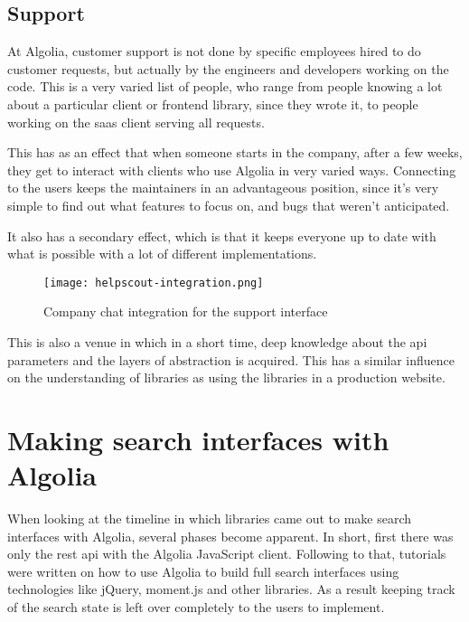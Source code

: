\subsection{Support}
\label{support}

At Algolia, customer support is not done by specific employees hired to do customer requests, but actually by the engineers and developers working on the code. This is a very varied list of people, who range from people knowing a lot about a particular client or frontend \gls{library}, since they wrote it, to people working on the \gls{saas} client serving all requests.

This has as an effect that when someone starts in the company, after a few weeks, they get to interact with clients who use Algolia in very varied ways. Connecting to the users keeps the maintainers in an advantageous position, since it's very simple to find out what features to focus on, and bugs that weren't anticipated.

It also has a secondary effect, which is that it keeps everyone up to date with what is possible with a lot of different implementations.

\begin{figure}[H]
  \centering
  \texttt{[image: helpscout-integration.png]}
  \caption{Company chat integration for the support interface}
  \label{figure:support}
\end{figure}

This is also a venue in which in a short time, deep knowledge about the \acrshort{api} parameters and the layers of abstraction is acquired. This has a similar influence on the understanding of libraries as using the libraries in a production website.

\section{Making search interfaces with Algolia} %
\label{sec:making_search_interfaces_with_algolia}

When looking at the timeline in which libraries came out to make search interfaces with Algolia, several phases become apparent. In short, first there was only the \acrshort{rest} \acrshort{api} with the Algolia JavaScript client. Following to that, tutorials were written on how to use Algolia to build full search interfaces using technologies like jQuery, moment.js and other libraries. As a result keeping track of the search state is left over completely to the users to implement.


